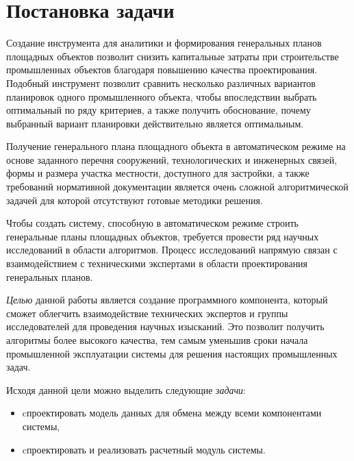 \section*{\Large{Постановка задачи}}

Создание инструмента для аналитики и формирования генеральных планов площадных объектов позволит снизить
капитальные затраты при строительстве промышленных объектов благодаря повышению качества проектирования.
Подобный инструмент позволит сравнить несколько различных вариантов планировок одного промышленного объекта,
чтобы впоследствии выбрать оптимальный по ряду критериев, а также получить обоснование,
почему выбранный вариант планировки действительно является оптимальным.

Получение генерального плана площадного объекта в автоматическом режиме на основе
заданного перечня сооружений, технологических и инженерных связей,
формы и размера участка местности, доступного для застройки, а также требований нормативной документации является очень
сложной алгоритмической задачей для которой отсутствуют готовые методики решения.

Чтобы создать систему, способную в автоматическом режиме строить генеральные планы площадных объектов,
требуется провести ряд научных исследований в области алгоритмов.
Процесс исследований напрямую связан с взаимодействием с техническими экспертами
в области проектирования генеральных планов.

\textit{Целью} данной работы является создание программного компонента,
который сможет облегчить взаимодействие технических экспертов
и группы исследователей для проведения научных изысканий.
Это позволит получить алгоритмы более высокого качества,
тем самым уменьшив сроки начала промышленной эксплуатации системы
для решения настоящих промышленных задач.

Исходя данной цели можно выделить следующие \textit{задачи}:
\begin{itemize}
    \item cпроектировать модель данных для обмена между всеми компонентами системы,
    \item cпроектировать и реализовать расчетный модуль системы.
\end{itemize}
